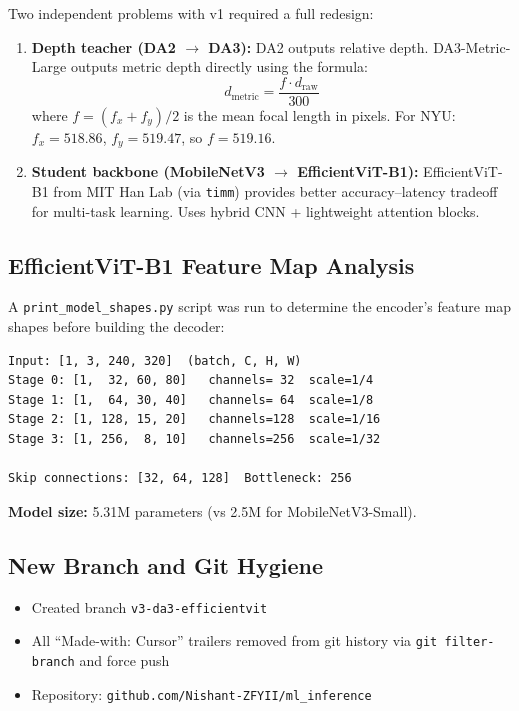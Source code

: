 \documentclass[11pt,a4paper]{article}
\begin{document}
Two independent problems with v1 required a full redesign:

\begin{enumerate}[nosep]
  \item \textbf{Depth teacher (DA2 $\to$ DA3):} DA2 outputs relative depth.
    DA3-Metric-Large outputs metric depth directly using the formula:
    \[
      d_{\text{metric}} = \frac{f \cdot d_{\text{raw}}}{300}
    \]
    where $f = (f_x + f_y)/2$ is the mean focal length in pixels.
    For NYU: $f_x = 518.86$, $f_y = 519.47$, so $f = 519.16$.

  \item \textbf{Student backbone (MobileNetV3 $\to$ EfficientViT-B1):}
    EfficientViT-B1 from MIT Han Lab (via \texttt{timm}) provides
    better accuracy--latency tradeoff for multi-task learning. Uses
    hybrid CNN + lightweight attention blocks.
\end{enumerate}

\subsection{EfficientViT-B1 Feature Map Analysis}

A \texttt{print\_model\_shapes.py} script was run to determine the
encoder's feature map shapes before building the decoder:

\begin{lstlisting}
Input: [1, 3, 240, 320]  (batch, C, H, W)
Stage 0: [1,  32, 60, 80]   channels= 32  scale=1/4
Stage 1: [1,  64, 30, 40]   channels= 64  scale=1/8
Stage 2: [1, 128, 15, 20]   channels=128  scale=1/16
Stage 3: [1, 256,  8, 10]   channels=256  scale=1/32

Skip connections: [32, 64, 128]  Bottleneck: 256
\end{lstlisting}

\textbf{Model size:} 5.31M parameters (vs 2.5M for MobileNetV3-Small).

\subsection{New Branch and Git Hygiene}

\begin{itemize}[nosep]
  \item Created branch \texttt{v3-da3-efficientvit}
  \item All ``Made-with: Cursor'' trailers removed from git history
    via \texttt{git filter-branch} and force push
  \item Repository: \texttt{github.com/Nishant-ZFYII/ml\_inference}
\end{itemize}
\end{document}
